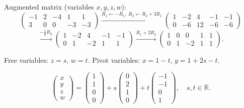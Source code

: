\documentclass[12pt,a3paper]{article}
\begin{document}
\begin{tcolorbox}[enhanced,breakable,colback=cB!4,colframe=cB,
  boxrule=0.8pt,arc=5pt,
  title={\textbf{Answer --- Solve: $-x+2y-4z+w=1$, $3x-3w=-3$}},
  fonttitle=\bfseries\color{white},colbacktitle=cB]

Augmented matrix (variables $x,y,z,w$):
\[
\left(\begin{array}{cccc|c}-1&2&-4&1&1\\3&0&0&-3&-3\end{array}\right)
\xrightarrow{R_1\leftarrow -R_1,\;R_2\leftarrow R_2+3R_1}
\left(\begin{array}{cccc|c}1&-2&4&-1&-1\\0&-6&12&-6&-6\end{array}\right)
\]
\[
\xrightarrow{-\frac{1}{6}R_2}
\left(\begin{array}{cccc|c}1&-2&4&-1&-1\\0&1&-2&1&1\end{array}\right)
\xrightarrow{R_1+2R_2}
\left(\begin{array}{cccc|c}1&0&0&1&1\\0&1&-2&1&1\end{array}\right).
\]

Free variables: $z=s$, $w=t$. Pivot variables: $x=1-t$, $y=1+2s-t$.

\[
\boxed{\begin{pmatrix}x\\y\\z\\w\end{pmatrix}=\begin{pmatrix}1\\1\\0\\0\end{pmatrix}+s\begin{pmatrix}0\\2\\1\\0\end{pmatrix}+t\begin{pmatrix}-1\\-1\\0\\1\end{pmatrix},\quad s,t\in\mathbb{R}.}
\]

\end{tcolorbox}
\end{document}
